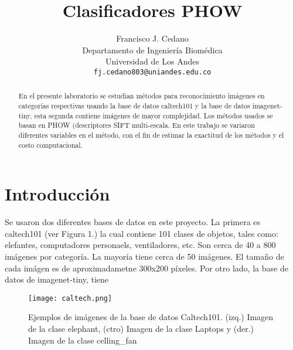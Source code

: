 \documentclass[10pt,twocolumn,letterpaper]{article}
\begin{document}
\title{Clasificadores PHOW}

\author{Francisco J. Cedano\\
Departamento de Ingenier\'ia Biom\'edica\\
Universidad de Los Andes\\
{\tt\small fj.cedano803@uniandes.edu.co}
}%


\maketitle

\begin{abstract}
   En el presente laboratorio se estudian métodos para reconocimiento imágenes en categorías respectivas usando la base de datos caltech101 y la base de datos imagenet-tiny, esta segunda contiene imágenes de mayor complejidad. Los métodos usados se basan en PHOW (descriptores SIFT multi-escala. En este trabajo se variaron diferentes variables en el método, con el fin de estimar la exactitud de los métodos y el costo computacional.
   
\end{abstract}

\section{Introducción}

Se usaron dos diferentes bases de datos en este proyecto. La primera es caltech101 (ver Figura 1.) la cual contiene 101 clases de objetos, tales como: elefantes, computadores personaels, ventiladores, etc. Son cerca de 40 a 800 imágenes por categoría. La mayoría tiene cerca de 50 imágenes. El tamaño de cada imágen es de aproximadametne 300x200 píxeles. Por otro lado, la base de datos de imagenet-tiny, tiene 

\begin{figure}[ht]
\centering
\texttt{[image: caltech.png]}
\caption{Ejemplos de imágenes de la base de datos Caltech101. (izq.) Imagen de la clase elephant, (ctro) Imagen de la clase Laptops y (der.) Imagen de la clase celling\_fan}
\end{figure}
\end{document}

